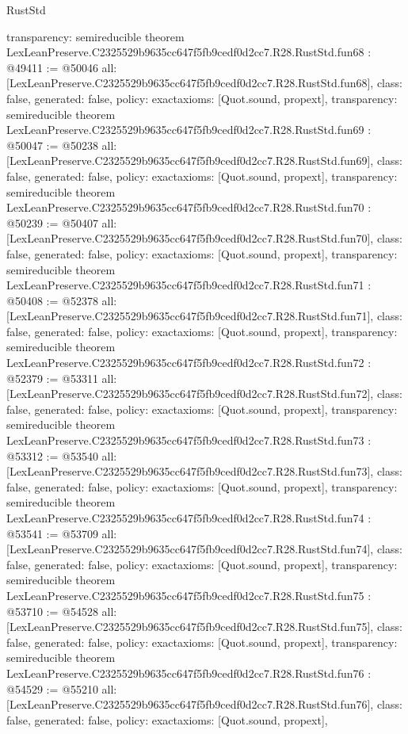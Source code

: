 \begin{lexlean}{RustStd}
\begin{coremodule}
{  transparency: semireducible
}
theorem LexLeanPreserve.C2325529b9635cc647f5fb9cedf0d2cc7.R28.RustStd.fun68 : @49411 := @50046 {
  all: [LexLeanPreserve.C2325529b9635cc647f5fb9cedf0d2cc7.R28.RustStd.fun68],
  class: false,
  generated: false,
  policy: exact{axioms: [Quot.sound, propext]},
  transparency: semireducible
}
theorem LexLeanPreserve.C2325529b9635cc647f5fb9cedf0d2cc7.R28.RustStd.fun69 : @50047 := @50238 {
  all: [LexLeanPreserve.C2325529b9635cc647f5fb9cedf0d2cc7.R28.RustStd.fun69],
  class: false,
  generated: false,
  policy: exact{axioms: [Quot.sound, propext]},
  transparency: semireducible
}
theorem LexLeanPreserve.C2325529b9635cc647f5fb9cedf0d2cc7.R28.RustStd.fun70 : @50239 := @50407 {
  all: [LexLeanPreserve.C2325529b9635cc647f5fb9cedf0d2cc7.R28.RustStd.fun70],
  class: false,
  generated: false,
  policy: exact{axioms: [Quot.sound, propext]},
  transparency: semireducible
}
theorem LexLeanPreserve.C2325529b9635cc647f5fb9cedf0d2cc7.R28.RustStd.fun71 : @50408 := @52378 {
  all: [LexLeanPreserve.C2325529b9635cc647f5fb9cedf0d2cc7.R28.RustStd.fun71],
  class: false,
  generated: false,
  policy: exact{axioms: [Quot.sound, propext]},
  transparency: semireducible
}
theorem LexLeanPreserve.C2325529b9635cc647f5fb9cedf0d2cc7.R28.RustStd.fun72 : @52379 := @53311 {
  all: [LexLeanPreserve.C2325529b9635cc647f5fb9cedf0d2cc7.R28.RustStd.fun72],
  class: false,
  generated: false,
  policy: exact{axioms: [Quot.sound, propext]},
  transparency: semireducible
}
theorem LexLeanPreserve.C2325529b9635cc647f5fb9cedf0d2cc7.R28.RustStd.fun73 : @53312 := @53540 {
  all: [LexLeanPreserve.C2325529b9635cc647f5fb9cedf0d2cc7.R28.RustStd.fun73],
  class: false,
  generated: false,
  policy: exact{axioms: [Quot.sound, propext]},
  transparency: semireducible
}
theorem LexLeanPreserve.C2325529b9635cc647f5fb9cedf0d2cc7.R28.RustStd.fun74 : @53541 := @53709 {
  all: [LexLeanPreserve.C2325529b9635cc647f5fb9cedf0d2cc7.R28.RustStd.fun74],
  class: false,
  generated: false,
  policy: exact{axioms: [Quot.sound, propext]},
  transparency: semireducible
}
theorem LexLeanPreserve.C2325529b9635cc647f5fb9cedf0d2cc7.R28.RustStd.fun75 : @53710 := @54528 {
  all: [LexLeanPreserve.C2325529b9635cc647f5fb9cedf0d2cc7.R28.RustStd.fun75],
  class: false,
  generated: false,
  policy: exact{axioms: [Quot.sound, propext]},
  transparency: semireducible
}
theorem LexLeanPreserve.C2325529b9635cc647f5fb9cedf0d2cc7.R28.RustStd.fun76 : @54529 := @55210 {
  all: [LexLeanPreserve.C2325529b9635cc647f5fb9cedf0d2cc7.R28.RustStd.fun76],
  class: false,
  generated: false,
  policy: exact{axioms: [Quot.sound, propext]},
}
\end{coremodule}
\end{lexlean}
